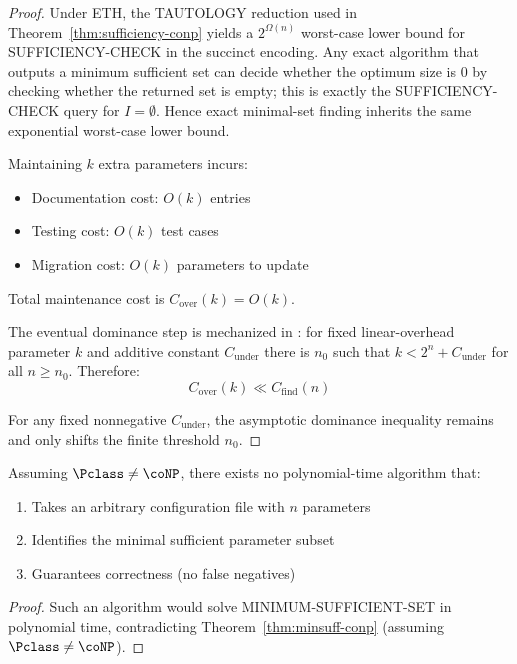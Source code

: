 \begin{proof}
Under ETH, the TAUTOLOGY reduction used in Theorem~\ref{thm:sufficiency-conp} yields a $2^{\Omega(n)}$ worst-case lower bound for SUFFICIENCY-CHECK in the succinct encoding. Any exact algorithm that outputs a minimum sufficient set can decide whether the optimum size is $0$ by checking whether the returned set is empty; this is exactly the SUFFICIENCY-CHECK query for $I=\emptyset$. Hence exact minimal-set finding inherits the same exponential worst-case lower bound.

Maintaining $k$ extra parameters incurs:
\begin{itemize}
\item Documentation cost: $O(k)$ entries
\item Testing cost: $O(k)$ test cases
\item Migration cost: $O(k)$ parameters to update
\end{itemize}

Total maintenance cost is $C_{\text{over}}(k) = O(k)$.

The eventual dominance step is mechanized in
:
for fixed linear-overhead parameter $k$ and additive constant $C_{\text{under}}$ there is
$n_0$ such that $k < 2^n + C_{\text{under}}$ for all $n \ge n_0$. Therefore:
\[
C_{\text{over}}(k) \ll C_{\text{find}}(n)
\]

For any fixed nonnegative $C_{\text{under}}$, the asymptotic dominance inequality remains and only shifts the finite threshold $n_0$.
\end{proof}

\begin{corollary}
\label{cor:no-auto-minimize}
Assuming $\Pclass \neq \coNP$, there exists no polynomial-time algorithm that:
\begin{enumerate}
\item Takes an arbitrary configuration file with $n$ parameters
\item Identifies the minimal sufficient parameter subset
\item Guarantees correctness (no false negatives)
\end{enumerate}
\end{corollary}

\begin{proof}
Such an algorithm would solve MINIMUM-SUFFICIENT-SET in polynomial time, contradicting Theorem~\ref{thm:minsuff-conp} (assuming $\Pclass \neq \coNP$).
\end{proof}

